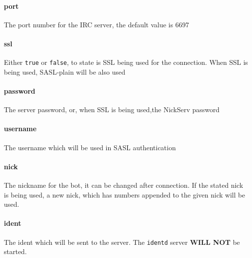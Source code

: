 \documentclass[a4paper,12pt,titlepage]{article}
\begin{document}
\paragraph{port} The port number for the IRC server, the default value is 6697
\paragraph{ssl} Either \texttt{true} or \texttt{false}, to state is SSL being used for the connection. When SSL is being used, SASL-plain will be also used
\paragraph{password} The server password, or, when SSL is being used,the NickServ password
\paragraph{username} The username which will be used in SASL authentication
\paragraph{nick} The nickname for the bot, it can be changed after connection. If the stated nick is being used, a new nick, which has numbers  appended to the given nick will be used.
\paragraph{ident} The ident which will be sent to the server. The \texttt{identd} server \textbf{WILL NOT} be started. 
\end{document}
